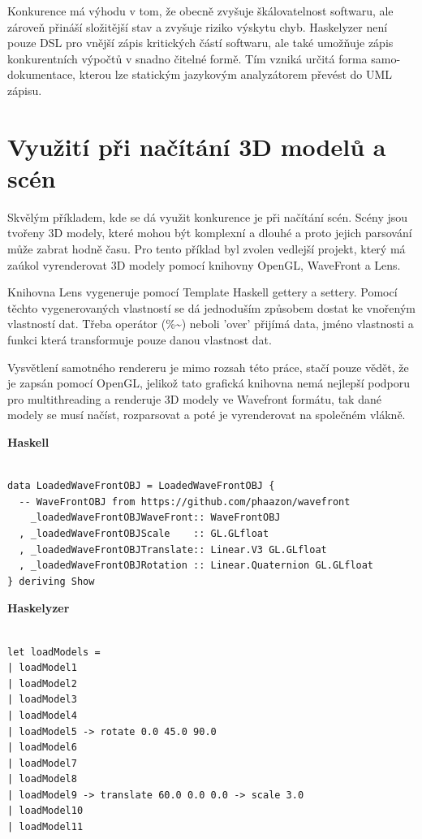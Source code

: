 \documentclass[male,czech]{kithesis}
\begin{document}
Konkurence má výhodu v tom, že obecně zvyšuje škálovatelnost softwaru, 
ale zároveň přináší složitější stav a zvyšuje riziko výskytu chyb. 
Haskelyzer není pouze DSL pro vnější zápis kritických částí softwaru, 
ale také umožňuje zápis konkurentních výpočtů v snadno čitelné formě. 
Tím vzniká určitá forma samo-dokumentace, 
kterou lze statickým jazykovým analyzátorem převést do UML zápisu.

\section{Využití při načítání 3D modelů a scén}

Skvělým příkladem, kde se dá využit konkurence je při načítání 
scén. Scény jsou tvořeny 3D modely, které mohou být komplexní a 
dlouhé a proto jejich parsování může zabrat hodně času. Pro 
tento příklad byl zvolen vedlejší projekt, který má zaúkol 
vyrenderovat 3D modely pomocí knihovny OpenGL, WaveFront a Lens. 

Knihovna Lens vygeneruje pomocí Template Haskell gettery a settery.
Pomocí těchto vygenerovaných vlastností se dá jednoduším způsobem 
dostat ke vnořeným vlastností dat. 
Třeba operátor (\%\textasciitilde) neboli 'over' přijímá data,
jméno vlastnosti a 
funkci která transformuje pouze danou vlastnost dat.

Vysvětlení samotného rendereru je mimo rozsah této práce, stačí 
pouze vědět, že je zapsán pomocí OpenGL, jelikož tato grafická 
knihovna nemá nejlepší podporu pro multithreading a renderuje 
3D modely ve Wavefront formátu, 
tak dané modely se musí načíst,
rozparsovat a 
poté je vyrenderovat na společném vlákně.

\textbf{Haskell}
\begin{verbatim}

data LoadedWaveFrontOBJ = LoadedWaveFrontOBJ {
  -- WaveFrontOBJ from https://github.com/phaazon/wavefront
    _loadedWaveFrontOBJWaveFront:: WaveFrontOBJ
  , _loadedWaveFrontOBJScale    :: GL.GLfloat
  , _loadedWaveFrontOBJTranslate:: Linear.V3 GL.GLfloat
  , _loadedWaveFrontOBJRotation :: Linear.Quaternion GL.GLfloat
} deriving Show

\end{verbatim}

\textbf{Haskelyzer}
\begin{verbatim}

let loadModels = 
| loadModel1 
| loadModel2 
| loadModel3 
| loadModel4 
| loadModel5 -> rotate 0.0 45.0 90.0
| loadModel6 
| loadModel7 
| loadModel8 
| loadModel9 -> translate 60.0 0.0 0.0 -> scale 3.0
| loadModel10 
| loadModel11 

\end{verbatim}
\end{document}
